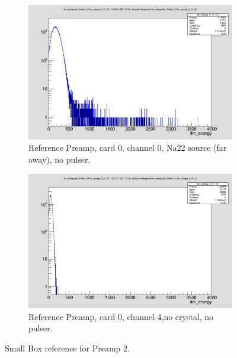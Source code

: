 \documentclass{report}
\begin{document}
\begin{figure}[!htb]
  \centering
  \begin{subfigure}[b]{0.45\textwidth}
    \includegraphics[width=\linewidth]{preamp2_ref_ch0.png}
          \caption{Reference Preamp, card 0, channel 0, Na22 source (far away), no pulser.}
  \end{subfigure}
  \begin{subfigure}[b]{0.4\textwidth}
    \includegraphics[width=\linewidth]{preamp2_ref_ch1_no_crystal.png}
    \caption{Reference Preamp, card 0, channel 4,no crystal, no pulser.}
  \end{subfigure}
  \caption{Small Box reference for Preamp 2.}
\end{figure}
\newpage
\clearpage
\end{document}
